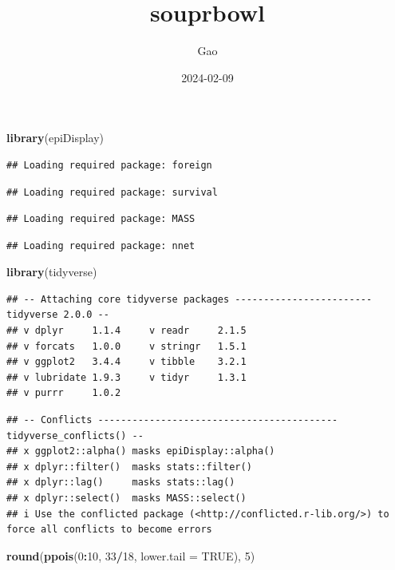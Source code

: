 \documentclass[
]{article}
\title{souprbowl}
\author{Gao}
\date{2024-02-09}
\newenvironment{Shaded}{\begin{snugshade}}{\end{snugshade}}
\newcommand{\AttributeTok}[1]{\textcolor[rgb]{0.13,0.29,0.53}{#1}}
\newcommand{\ConstantTok}[1]{\textcolor[rgb]{0.56,0.35,0.01}{#1}}
\newcommand{\DecValTok}[1]{\textcolor[rgb]{0.00,0.00,0.81}{#1}}
\newcommand{\FunctionTok}[1]{\textcolor[rgb]{0.13,0.29,0.53}{\textbf{#1}}}
\newcommand{\NormalTok}[1]{#1}
\newcommand{\SpecialCharTok}[1]{\textcolor[rgb]{0.81,0.36,0.00}{\textbf{#1}}}
\begin{document}
\maketitle

\begin{Shaded}
\begin{Highlighting}[]
\FunctionTok{library}\NormalTok{(epiDisplay)}
\end{Highlighting}
\end{Shaded}

\begin{verbatim}
## Loading required package: foreign
\end{verbatim}

\begin{verbatim}
## Loading required package: survival
\end{verbatim}

\begin{verbatim}
## Loading required package: MASS
\end{verbatim}

\begin{verbatim}
## Loading required package: nnet
\end{verbatim}

\begin{Shaded}
\begin{Highlighting}[]
\FunctionTok{library}\NormalTok{(tidyverse)}
\end{Highlighting}
\end{Shaded}

\begin{verbatim}
## -- Attaching core tidyverse packages ------------------------ tidyverse 2.0.0 --
## v dplyr     1.1.4     v readr     2.1.5
## v forcats   1.0.0     v stringr   1.5.1
## v ggplot2   3.4.4     v tibble    3.2.1
## v lubridate 1.9.3     v tidyr     1.3.1
## v purrr     1.0.2
\end{verbatim}

\begin{verbatim}
## -- Conflicts ------------------------------------------ tidyverse_conflicts() --
## x ggplot2::alpha() masks epiDisplay::alpha()
## x dplyr::filter()  masks stats::filter()
## x dplyr::lag()     masks stats::lag()
## x dplyr::select()  masks MASS::select()
## i Use the conflicted package (<http://conflicted.r-lib.org/>) to force all conflicts to become errors
\end{verbatim}

\begin{Shaded}
\begin{Highlighting}[]
\FunctionTok{round}\NormalTok{(}\FunctionTok{ppois}\NormalTok{(}\DecValTok{0}\SpecialCharTok{:}\DecValTok{10}\NormalTok{, }\DecValTok{33}\SpecialCharTok{/}\DecValTok{18}\NormalTok{, }\AttributeTok{lower.tail =} \ConstantTok{TRUE}\NormalTok{), }\DecValTok{5}\NormalTok{)}
\end{Highlighting}
\end{Shaded}
\end{document}

